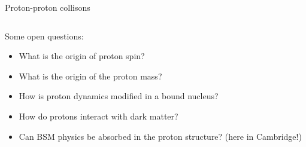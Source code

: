 \documentclass[8pt,t]{beamer}
\begin{document}
\begin{frame}{Proton-proton collisons}
\begin{columns}
\begin{column}{0.5\textwidth}
      \vspace*{2em}
      Some open questions:
      \begin{itemize}
        \item What is the origin of proton spin?
        \item What is the origin of the proton mass?
        \item How is proton dynamics modified in a bound nucleus?
        \item How do protons interact with dark matter?
        \item Can BSM physics be absorbed in the proton structure? (here in Cambridge!)
      \end{itemize}
    \end{column}
  \end{columns}

\end{frame}
\end{document}
